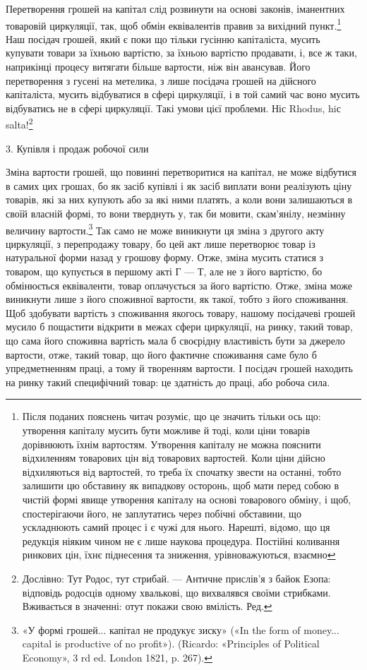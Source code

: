 Перетворення грошей на капітал слід розвинути на основі
законів, іманентних товаровій циркуляції, так, щоб обмін еквівалентів
правив за вихідний пункт.\footnote{
Після поданих пояснень читач розуміє, що це значить тільки ось
що: утворення капіталу мусить бути можливе й тоді, коли ціни товарів
дорівнюють їхнім вартостям. Утворення капіталу не можна пояснити відхиленням
товарових цін від товарових вартостей. Коли ціни дійсно
відхиляються від вартостей, то треба їх спочатку звести на останні, тобто
залишити цю обставину як випадкову осторонь, щоб мати перед собою в
чистій формі явище утворення капіталу на основі товарового обміну, і
щоб, спостерігаючи його, не заплутатись через побічні обставини, що
ускладнюють самий процес і є чужі для нього. Нарешті, відомо, що ця
редукція ніяким чином не є лише наукова процедура. Постійні коливання
ринкових цін, їхнє піднесення та зниження, урівноважуються,
взаємно
} Наш посідач грошей, який
є поки що тільки гусінню капіталіста, мусить купувати товари
за їхньою вартістю, за їхньою вартістю продавати, і, все ж таки,
наприкінці процесу витягати більше вартости, ніж він авансував.
Його перетворення з гусені на метелика, з лише посідача
грошей на дійсного капіталіста, мусить відбуватися в сфері
циркуляції, і в той самий час воно мусить відбуватись не
в сфері циркуляції. Такі умови цієї проблеми. Ніс Rhodus,
hiс salta!\footnote*{
Дослівно: Тут Родос, тут стрибай. — Античне прислів’я з байок
Езопа: відповідь родосців одному хвалькові, що вихвалявся своїми
стрибками. Вживається в значенні: отут покажи свою вмілість. Ред.
}

3. Купівля і продаж робочої сили

Зміна вартости грошей, що повинні перетворитися на капітал,
не може відбутися в самих цих грошах, бо як засіб купівлі і як
засіб виплати вони реалізують ціну товарів, які за них купують
або за які ними платять, а коли вони залишаються в своїй власній
формі, то вони тверднуть у, так би мовити, скам’янілу, незмінну
величину вартости.\footnote{
«У формі грошей... капітал не продукує зиску» («In the form of
money... capital is productive of no profit»). (Ricardo: «Principles of
Political Economy», 3 rd ed. London 1821, p. 267).
} Так само не може виникнути ця зміна з
другого акту циркуляції, з перепродажу товару, бо цей акт лише
перетворює товар із натуральної форми назад у грошову форму.
Отже, зміна мусить статися з товаром, що купується в першому
акті Г — Т, але не з його вартістю, бо обмінюється еквіваленти,
товар оплачується за його вартістю. Отже, зміна може виникнути
лише з його споживної вартости, як такої, тобто з його споживання.
Щоб здобувати вартість з споживання якогось товару, нашому
посідачеві грошей мусило б пощастити відкрити в межах сфери
циркуляції, на ринку, такий товар, що сама його споживна вартість
мала б своєрідну властивість бути за джерело вартости,
отже, такий товар, що його фактичне споживання саме було б
упредметненням праці, а тому й творенням вартости. І посідач
грошей находить на ринку такий специфічний товар: це здатність
до праці, або робоча сила.

